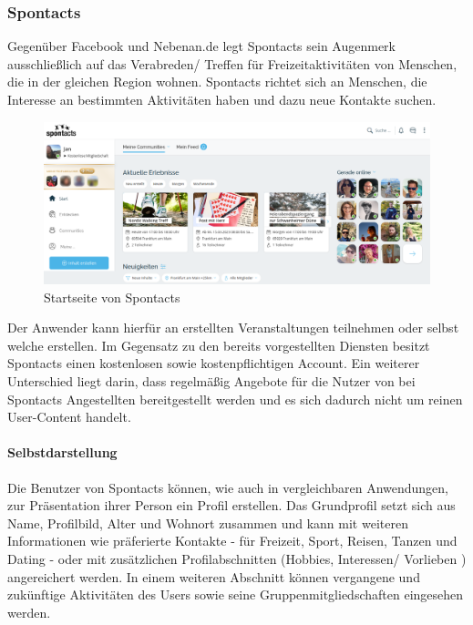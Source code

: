 \subsubsection{Spontacts}

Gegenüber Facebook und Nebenan.de legt Spontacts sein Augenmerk ausschließlich auf das Verabreden/ Treffen für Freizeitaktivitäten von Menschen, die in der gleichen Region wohnen. Spontacts richtet sich an Menschen, die Interesse an bestimmten Aktivitäten haben und dazu neue Kontakte suchen.

\begin{figure}
    \centering
    \includegraphics[width=\textwidth]{figures/jan/pic_spontacts.png}
    \caption[Startseite von Spontacts]{Startseite von Spontacts}
    \label{fig:spontacts}
\end{figure}

Der Anwender kann hierfür an erstellten Veranstaltungen teilnehmen oder selbst welche erstellen. Im Gegensatz zu den bereits vorgestellten Diensten besitzt Spontacts einen kostenlosen sowie kostenpflichtigen Account. Ein weiterer Unterschied liegt darin, dass regelmäßig Angebote für die Nutzer von bei Spontacts Angestellten bereitgestellt werden und es sich dadurch nicht um reinen User-Content handelt.

\paragraph{Selbstdarstellung}

Die Benutzer von Spontacts können, wie auch in vergleichbaren Anwendungen, zur Präsentation ihrer Person ein Profil erstellen. Das Grundprofil setzt sich aus Name, Profilbild, Alter und Wohnort zusammen und kann mit weiteren Informationen wie \bspw präferierte Kontakte - für Freizeit, Sport, Reisen, Tanzen und Dating - oder mit zusätzlichen Profilabschnitten (Hobbies, Interessen/ Vorlieben \usw) angereichert werden. In einem weiteren Abschnitt können vergangene und zukünftige Aktivitäten des Users sowie seine Gruppenmitgliedschaften eingesehen werden.

